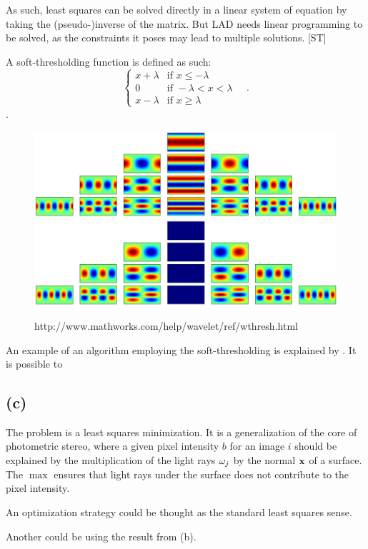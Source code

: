 \documentclass{report}
\begin{document}
As such, least squares can be solved directly in a linear system of equation by taking the (pseudo-)inverse of the matrix. But LAD needs linear programming to be solved, as the constraints it poses may lead to multiple solutions. [ST]

A soft-thresholding function is defined as such:
\begin{equation}
\begin{cases}
  x + \lambda & \text{if } x\leq -\lambda \\
  0           & \text{if } -\lambda < x < \lambda \\
  x - \lambda & \text{if } x\geq \lambda
\end{cases}
\quad.
\end{equation}
.

\begin{figure}
  \centering
  \includegraphics[width=0.45\linewidth]{q8_a_pyramid_real.png}
  \includegraphics[width=0.45\linewidth]{q8_a_pyramid_imag.png}
  \caption[ Description ]
   {http://www.mathworks.com/help/wavelet/ref/wthresh.html}
\end{figure}

An example of an algorithm employing the soft-thresholding is explained by \cite{Kowalski2015}. It is possible to 

\subsection{(c)}

The problem is a least squares minimization. It is a generalization of the core of photometric stereo, where a given pixel intensity $b$ for an image $i$ should be explained by the multiplication of the light rays $\mathbf{\omega}_j$ by the normal $\mathbf{x}$ of a surface. The $\max$ ensures that light rays under the surface does not contribute to the pixel intensity.

An optimization strategy could be thought as the standard least squares sense.

Another could be using the result from (b).
\end{document}
